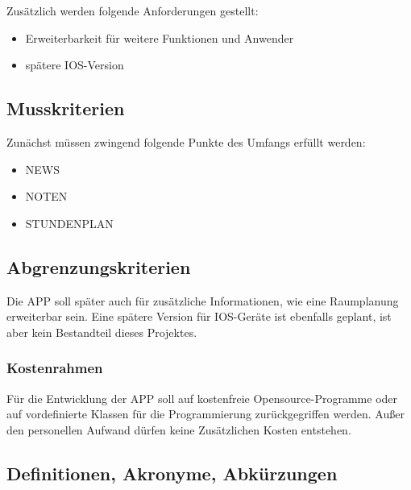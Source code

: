 Zusätzlich werden folgende Anforderungen gestellt:

\begin{itemize}
	\item Erweiterbarkeit für weitere Funktionen und Anwender
	\item spätere IOS-Version
\end{itemize}


\subsection{\textbf{Musskriterien}}

Zunächst müssen zwingend folgende Punkte des Umfangs erfüllt werden:

\begin{itemize}
   	\item NEWS
   	\item NOTEN
   	\item STUNDENPLAN   
\end{itemize}

\subsection{\textbf{Abgrenzungskriterien}}

Die \acs{APP} soll später auch für zusätzliche Informationen, wie eine Raumplanung erweiterbar sein. Eine spätere Version für IOS-Geräte ist ebenfalls geplant, ist aber kein Bestandteil dieses Projektes.				

\subsubsection{Kostenrahmen}

Für die Entwicklung der \acs{APP} soll auf kostenfreie Opensource-Programme oder auf vordefinierte Klassen für die Programmierung zurückgegriffen werden.
Außer den personellen Aufwand dürfen keine Zusätzlichen Kosten entstehen.


\subsection{\textbf{Definitionen, Akronyme, Abkürzungen}}
\begin{acronym}[UV-Licht]


\end{acronym}

